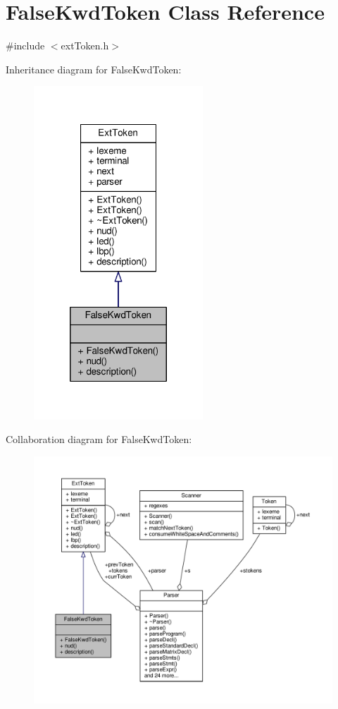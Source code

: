 \hypertarget{classFalseKwdToken}{\section{False\-Kwd\-Token Class Reference}
\label{classFalseKwdToken}
}


{\ttfamily \#include $<$ext\-Token.\-h$>$}



Inheritance diagram for False\-Kwd\-Token\-:\nopagebreak
\begin{figure}[H]
\begin{center}
\leavevmode
\includegraphics[width=180pt]{classFalseKwdToken__inherit__graph}
\end{center}
\end{figure}


Collaboration diagram for False\-Kwd\-Token\-:\nopagebreak
\begin{figure}[H]
\begin{center}
\leavevmode
\includegraphics[width=350pt]{classFalseKwdToken__coll__graph}
\end{center}
\end{figure}
